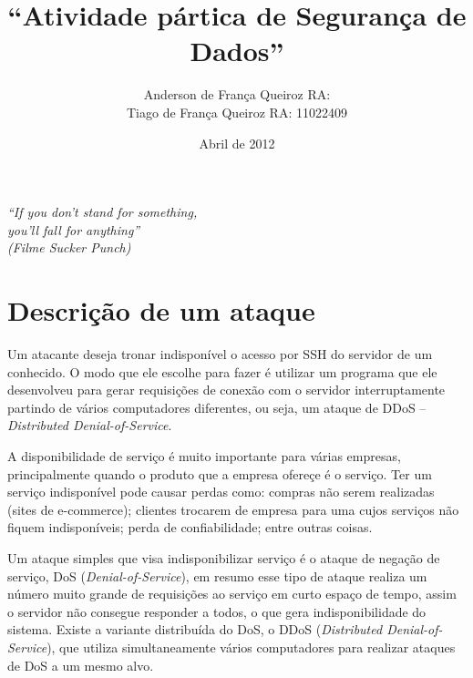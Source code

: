 \documentclass[12pt]{abnt}
\title{``Atividade pártica de Segurança de Dados''}
\author{Anderson de França Queiroz RA:\\
Tiago de França Queiroz RA: 11022409}
\date{Abril de 2012}
\begin{document}
\sloppy

\maketitle

\begin{titlepage}

  \vspace{6cm}

  \begin{flushleft}
    \sffamily\slshape
    ``If you don't stand for something,\\
	you'll fall for anything''\\
	(Filme Sucker Punch)
   
    \vspace{1cm}
    
    \end{flushleft}

\end{titlepage}

\tableofcontents
\clearpage

\chapter{Descrição de um ataque}

Um atacante deseja tronar indisponível o acesso por SSH do servidor de um conhecido. O modo que ele escolhe para fazer é utilizar
um programa que ele desenvolveu para gerar requisições de conexão com o servidor interruptamente partindo de vários computadores
diferentes, ou seja, um ataque de DDoS -- \textit{Distributed Denial-of-Service}.


A disponibilidade de serviço é muito importante para várias empresas, principalmente quando o produto que a empresa ofereçe é o serviço.
Ter um serviço indisponível pode causar perdas como: compras não serem realizadas (sites de e-commerce); clientes trocarem de empresa para uma cujos
serviços não fiquem indisponíveis; perda de confiabilidade; entre outras coisas.

Um ataque simples
que visa indisponibilizar serviço é o ataque de negação de serviço, DoS (\textit{Denial-of-Service}), 
em resumo esse tipo de ataque realiza um número muito grande
de requisições ao serviço em curto espaço de tempo, assim o servidor não consegue responder a todos, o que gera indisponibilidade do sistema.
Existe a variante distribuída do DoS, o DDoS (\textit{Distributed Denial-of-Service}), 
que utiliza simultaneamente vários computadores para realizar ataques de DoS a um mesmo alvo.
\end{document}
